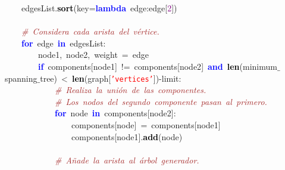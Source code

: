 \mbox{}\ \ \ \ edgesList\textcolor{BrickRed}{.}\textbf{\textcolor{Black}{sort}}\textcolor{BrickRed}{(}key\textcolor{BrickRed}{=}\textbf{\textcolor{Blue}{lambda}}\ edge\textcolor{BrickRed}{:}edge\textcolor{BrickRed}{[}\textcolor{Purple}{2}\textcolor{BrickRed}{])} \\
\mbox{} \\
\mbox{}\ \ \ \ \textit{\textcolor{Brown}{\#\ Considera\ cada\ arista\ del\ vértice.}} \\
\mbox{}\ \ \ \ \textbf{\textcolor{Blue}{for}}\ edge\ \textbf{\textcolor{Blue}{in}}\ edgesList\textcolor{BrickRed}{:} \\
\mbox{}\ \ \ \ \ \ \ \ node1\textcolor{BrickRed}{,}\ node2\textcolor{BrickRed}{,}\ weight\ \textcolor{BrickRed}{=}\ edge \\
\mbox{}\ \ \ \ \ \ \ \ \textbf{\textcolor{Blue}{if}}\ components\textcolor{BrickRed}{[}node1\textcolor{BrickRed}{]}\ \textcolor{BrickRed}{!=}\ components\textcolor{BrickRed}{[}node2\textcolor{BrickRed}{]}\ \textbf{\textcolor{Blue}{and}}\ \textbf{\textcolor{Black}{len}}\textcolor{BrickRed}{(}minimum$\_$spanning$\_$tree\textcolor{BrickRed}{)}\ \textcolor{BrickRed}{\textless{}}\ \textbf{\textcolor{Black}{len}}\textcolor{BrickRed}{(}graph\textcolor{BrickRed}{[}\texttt{\textcolor{Red}{'vertices'}}\textcolor{BrickRed}{])-}limit\textcolor{BrickRed}{:} \\
\mbox{}\ \ \ \ \ \ \ \ \ \ \ \ \textit{\textcolor{Brown}{\#\ Realiza\ la\ unión\ de\ las\ componentes.}} \\
\mbox{}\ \ \ \ \ \ \ \ \ \ \ \ \textit{\textcolor{Brown}{\#\ Los\ nodos\ del\ segundo\ componente\ pasan\ al\ primero.}} \\
\mbox{}\ \ \ \ \ \ \ \ \ \ \ \ \textbf{\textcolor{Blue}{for}}\ node\ \textbf{\textcolor{Blue}{in}}\ components\textcolor{BrickRed}{[}node2\textcolor{BrickRed}{]:} \\
\mbox{}\ \ \ \ \ \ \ \ \ \ \ \ \ \ \ \ components\textcolor{BrickRed}{[}node\textcolor{BrickRed}{]}\ \textcolor{BrickRed}{=}\ components\textcolor{BrickRed}{[}node1\textcolor{BrickRed}{]} \\
\mbox{}\ \ \ \ \ \ \ \ \ \ \ \ \ \ \ \ components\textcolor{BrickRed}{[}node1\textcolor{BrickRed}{].}\textbf{\textcolor{Black}{add}}\textcolor{BrickRed}{(}node\textcolor{BrickRed}{)} \\
\mbox{}\ \ \ \ \ \ \ \ \ \ \ \  \\
\mbox{}\ \ \ \ \ \ \ \ \ \ \ \ \textit{\textcolor{Brown}{\#\ Añade\ la\ arista\ al\ árbol\ generador.}} \\

